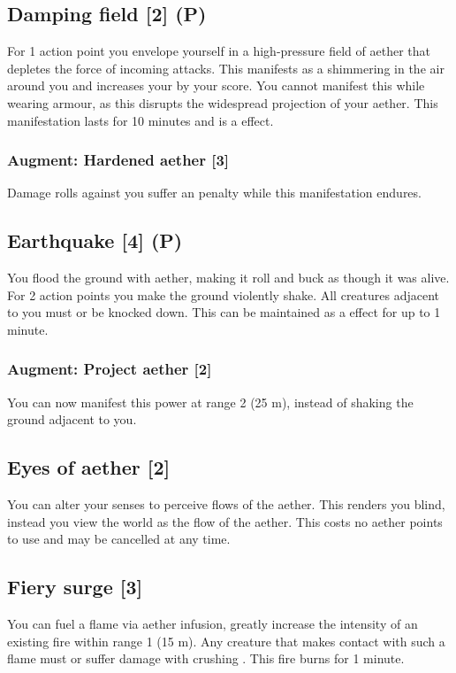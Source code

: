 \subsection{Damping field [2] (P)}
\label{spell:arcane-armour}
For 1 action point you envelope yourself in a high-pressure field of aether that depletes the force of incoming attacks. This manifests as a shimmering in the air around you and increases your  by your  score. You cannot manifest this while wearing armour, as this disrupts the widespread projection of your aether. This manifestation lasts for 10 minutes and is a  effect.
\subsubsection{Augment: Hardened aether [3]}
Damage rolls against you suffer an  penalty while this manifestation endures.


\subsection{Earthquake [4] (P)}
You flood the ground with aether, making it roll and buck as though it was alive. For 2 action points you make the ground violently shake. All creatures adjacent to you must  or be knocked down. This can be maintained as a  effect for up to 1 minute. 
\subsubsection{Augment: Project aether [2]}
You can now manifest this power at range 2 (25 m), instead of shaking the ground adjacent to you.


\subsection{Eyes of aether [2]}
You can alter your senses to perceive flows of the aether. This renders you blind, instead you view the world as the flow of the aether. This costs no aether points to use and may be cancelled at any time.


\subsection{Fiery surge [3]}
You can fuel a flame via aether infusion, greatly increase the intensity of an existing fire within range 1 (15 m). Any creature that makes contact with such a flame must  or suffer damage with crushing . This fire burns for 1 minute.


